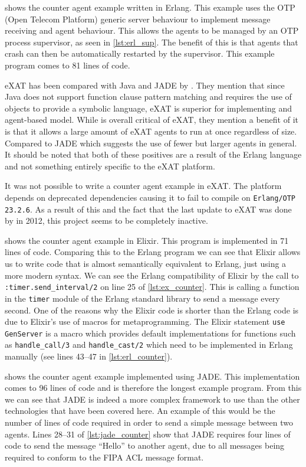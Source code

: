  shows the counter agent example written in Erlang.
This example uses the OTP (Open Telecom Platform) generic server behaviour to implement message receiving and agent behaviour.
This allows the agents to be managed by an OTP process supervisor, as seen in \cref{lst:erl_sup}.
The benefit of this is that agents that crash can then be automatically restarted by the supervisor.
This example program comes to 81 lines of code.

eXAT has been compared with Java and JADE by .
They mention that since Java does not support function clause pattern matching and requires the use of objects to provide a symbolic language, eXAT is superior for implementing and agent-based model.
While  is overall critical of eXAT, they mention a benefit of it is that it allows a large amount of eXAT agents to run at once regardless of size.
Compared to JADE which suggests the use of fewer but larger agents in general.
It should be noted that both of these positives are a result of the Erlang language and not something entirely specific to the eXAT platform.

It was not possible to write a counter agent example in eXAT\@.
The platform depends on deprecated dependencies causing it to fail to compile on \verb|Erlang/OTP 23.2.6|.
As a result of this and the fact that the last update to eXAT was done by  in 2012, this project seems to be completely inactive.

 shows the counter agent example in Elixir.
This program is implemented in 71 lines of code.
Comparing this to the Erlang program we can see that Elixir allows us to write code that is almost semantically equivalent to Erlang, just using a more modern syntax.
We can see the Erlang compatibility of Elixir by the call to \verb|:timer.send_interval/2| on line 25 of \cref{lst:ex_counter}.
This is calling a function in the \verb|timer| module of the Erlang standard library to send a message every second.
One of the reasons why the Elixir code is shorter than the Erlang code is due to Elixir's use of macros for metaprogramming.
The Elixir statement \verb|use GenServer| is a macro which provides default implementations for functions such as \verb|handle_call/3| and \verb|handle_cast/2| which need to be implemented in Erlang manually (see lines 43--47 in \cref{lst:erl_counter}).

 shows the counter agent example implemented using JADE\@.
This implementation comes to 96 lines of code and is therefore the longest example program.
From this we can see that JADE is indeed a more complex framework to use than the other technologies that have been covered here.
An example of this would be the number of lines of code required in order to send a simple message between two agents.
Lines 28--31 of \cref{lst:jade_counter} show that JADE requires four lines of code to send the message ``Hello'' to another agent, due to all messages being required to conform to the FIPA ACL message format.

